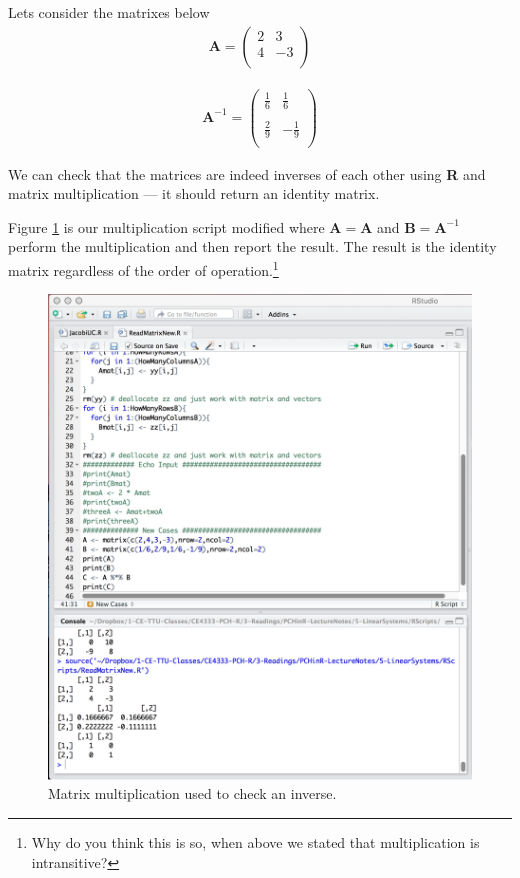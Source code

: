 Lets consider the matrixes below
\begin{gather}
\mathbf{A}=
\begin{pmatrix}
2 & 3 \\
4 & -3 \\
\end{pmatrix}
\end{gather}

\begin{gather}
\mathbf{A}^{-1}=
\begin{pmatrix}
\frac{1}{6} & \frac{1}{6} \\
~\\
\frac{2}{9} & -\frac{1}{9} \\
\end{pmatrix}
\end{gather}

We can check that the matrices are indeed inverses of each other using \textbf{R} and matrix multiplication --- it should return an identity matrix.
  
Figure \ref{fig:InverseMatrixCheck} is our multiplication script modified where $\mathbf{A} = \mathbf{A} $ and $\mathbf{B} = \mathbf{A}^{-1}$
perform the multiplication and then report the result.   
The result is the identity matrix regardless of the order of operation.\footnote{Why do you think this is so, when above we stated that multiplication is intransitive?}

\begin{figure}[h!] %
   \centering
   \includegraphics[width=6in]{./5-LinearSystems/InverseMatrixCheck.jpg} 
   \caption{Matrix multiplication used to check an inverse.}
   \label{fig:InverseMatrixCheck}
\end{figure}

